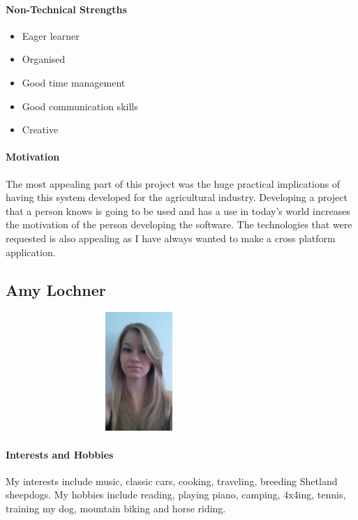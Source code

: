 \documentclass[english]{article}
\begin{document}
		\paragraph{Non-Technical Strengths}
		\begin{itemize}
			\setlength\itemsep{0.2em}
			\item Eager learner
			\item Organised 
			\item Good time management
			\item Good communication skills
			\item Creative
		\end{itemize}
		
		\paragraph{Motivation}
		The most appealing part of this project was the huge practical implications of having this system developed for the agricultural industry. Developing a project that a person knows is going to be used and has a use in today's world increases the motivation of the person developing the software. The technologies that were requested is also appealing as I have always wanted to make a cross platform application.
		
		\newpage
		\subsection{Amy Lochner}
		\begin{figure}
			\begin{center}
				\includegraphics[width=8cm, height=4.5cm, angle=90]{amy.jpg}
			\end{center}
		\end{figure}
		\paragraph{Interests and Hobbies}
		My interests include music, classic cars, cooking, traveling, breeding Shetland sheepdogs. My hobbies include reading, playing piano, camping, 4x4ing, tennis, training my dog, mountain biking and horse riding.
		
\end{document}
